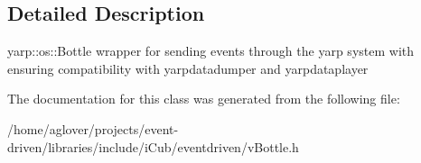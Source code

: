 \subsection{Detailed Description}
yarp\+::os\+::\+Bottle wrapper for sending events through the yarp system with ensuring compatibility with yarpdatadumper and yarpdataplayer 

The documentation for this class was generated from the following file\+:\begin{DoxyCompactItemize}
\item 
/home/aglover/projects/event-\/driven/libraries/include/i\+Cub/eventdriven/v\+Bottle.\+h\end{DoxyCompactItemize}
